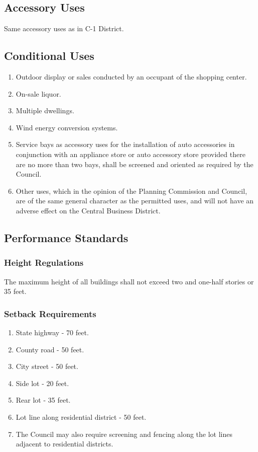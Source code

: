 \subsection{Accessory Uses}
Same accessory uses as in C-1 District.
\subsection{Conditional Uses}
\begin{enumerate}[{\indent}1)]
    \item Outdoor display or sales conducted by an occupant of the shopping center.
    \item On-sale liquor.  
    \item Multiple dwellings.
    \item Wind energy conversion systems.
    \item Service bays as accessory uses for the installation of auto accessories in conjunction with an appliance store or auto accessory store provided there are no more than two bays, shall be screened and oriented as required by the Council.
    \item Other uses, which in the opinion of the Planning Commission and Council, are of the same general character as the permitted uses, and will not have an adverse effect on the Central Business District.
\end{enumerate}
\subsection{Performance Standards}
\subsubsection{Height Regulations}
The maximum height of all buildings shall not exceed two and one-half stories or 35 feet.
\subsubsection{Setback Requirements}
\begin{enumerate}[{\indent}a)]
    \item State highway - 70 feet.  
    \item County road - 50 feet.
    \item City street - 50 feet.
    \item Side lot - 20 feet.  
    \item Rear lot - 35 feet.
    \item Lot line along residential district - 50 feet.
    \item The Council may also require screening and fencing along the lot lines adjacent to residential districts.
\end{enumerate}
